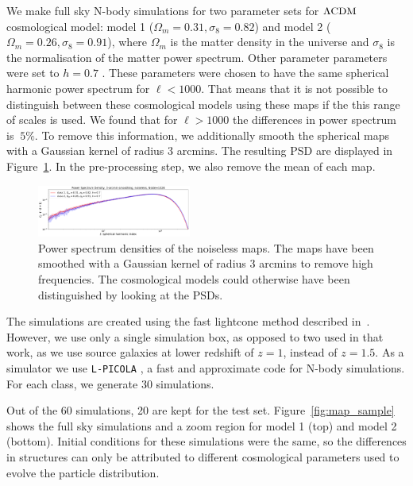\documentclass[final,twocolumn,3p,times,authoryear]{elsarticle}
\newcommand{\todo}[1]{{\color[rgb]{.6,.1,.6}{#1}}}
\newcommand{\figref}[1]{Figure~\ref{fig:#1}}
\newcommand{\1}{\b{1}}              %
\newcommand{\0}{\b{0}}              %
\newcommand{\pkg}[1]{\texttt{#1}}
\begin{document}
We make full sky N-body simulations for two parameter sets for $\Lambda \rm{CDM} $ cosmological model: model 1 ($\Omega_m=0.31, \sigma_8=0.82$) and model 2 ($\Omega_m=0.26, \sigma_8=0.91$), where $\Omega_m$ is the matter density in the universe and $\sigma_8$ is the normalisation of the matter power spectrum.
Other parameter parameters were set to $h=0.7$ \todo{(MORE PARAMS HERE - CHECK WITH RAPHAEL)}.
These parameters were chosen to have the same spherical harmonic power spectrum for $\ell<1000$.
That means that it is not possible to distinguish between these cosmological models using these maps if the this range of scales is used.
We found that for $\ell>1000$ the differences in power spectrum is $~5\%$.
To remove this information, we additionally smooth the spherical maps with a Gaussian kernel of radius $3$ arcmins. The resulting PSD are displayed in \figref{psd_sigma3}. In the pre-processing step, we also remove the mean of each map.

\begin{figure}[!ht]
\centering
\includegraphics[width=0.45\textwidth]{figures/psd_sigma3.pdf}
\caption{Power spectrum densities of the noiseless maps. The maps have been smoothed with a Gaussian kernel of radius $3$ arcmins to remove high frequencies. The cosmological models could otherwise have been distinguished by looking at the PSDs.}
\label{fig:psd_sigma3}
\end{figure}

The simulations are created using the fast lightcone method described in~\citep{sgier2018fastgeneration}.
However, we use only a single simulation box, as opposed to two used in that work, as we use source galaxies at lower redshift of $z=1$, instead of $z=1.5$.
As a simulator we use \pkg{L-PICOLA} \citep{howlett2015lpicola}, a fast and approximate code for N-body simulations.
For each class, we generate 30 simulations.

Out of the 60 simulations, 20 are kept for the test set.
\figref{map_sample} shows the full sky simulations and a zoom region for model 1 (top) and model 2 (bottom).
Initial conditions for these simulations were the same, so the differences in structures can only be attributed to different cosmological parameters used to evolve the particle distribution.
\end{document}
